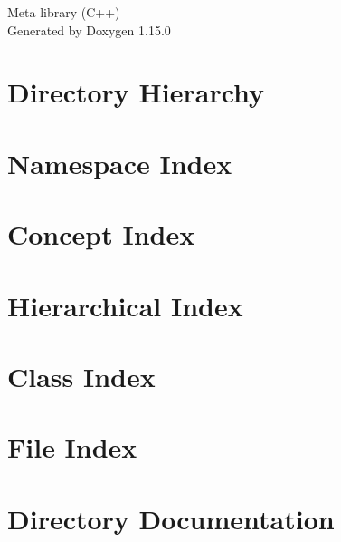 \documentclass[twoside]{book}
\newcommand{\+}{\discretionary{\mbox{\scriptsize$\hookleftarrow$}}{}{}}
\newcommand{\clearemptydoublepage}{%
    \newpage{\pagestyle{empty}\cleardoublepage}%
  }
\begin{document}
  \raggedbottom
    \hypersetup{pageanchor=false,
                bookmarksnumbered=true,
                pdfencoding=unicode
               }
  \begin{titlepage}
  \vspace*{7cm}
  \begin{center}%
  {\Large Meta library (\+C++)}\\
  \vspace*{1cm}
  {\large Generated by Doxygen 1.15.0}\\
  \end{center}
  \end{titlepage}
  \clearemptydoublepage
  \tableofcontents
  \clearemptydoublepage
  \hypersetup{pageanchor=true}


\chapter{Directory Hierarchy}

\chapter{Namespace Index}

\chapter{Concept Index}

\chapter{Hierarchical Index}

\chapter{Class Index}

\chapter{File Index}

\chapter{Directory Documentation}













\end{document}
